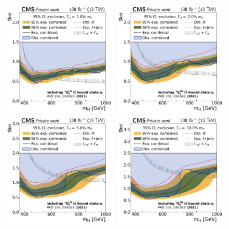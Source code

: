 \begin{figure}[!ph]
    \centering
    \includegraphics[width=0.42\textwidth]{figures/ah/limits_combined/etat/H_limit_w1p0_g-scan.pdf}%
    \hspace*{0.05\textwidth}%
    \includegraphics[width=0.42\textwidth]{figures/ah/limits_combined/etat/H_limit_w2p0_g-scan.pdf} \\
    \includegraphics[width=0.42\textwidth]{figures/ah/limits_combined/etat/H_limit_w5p0_g-scan.pdf}%
    \hspace*{0.05\textwidth}%
    \includegraphics[width=0.42\textwidth]{figures/ah/limits_combined/etat/H_limit_w10p0_g-scan.pdf}

\end{figure}
